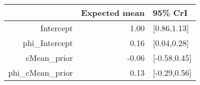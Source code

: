 \begin{tabular}{rrl}
  \hline
 & Expected mean & 95\% CrI \\ 
  \hline
Intercept & 1.00 & [0.86,1.13] \\ 
  phi\_Intercept & 0.16 & [0.04,0.28] \\ 
  cMean\_prior & -0.06 & [-0.58,0.45] \\ 
  phi\_cMean\_prior & 0.13 & [-0.29,0.56] \\ 
   \hline
\end{tabular}

